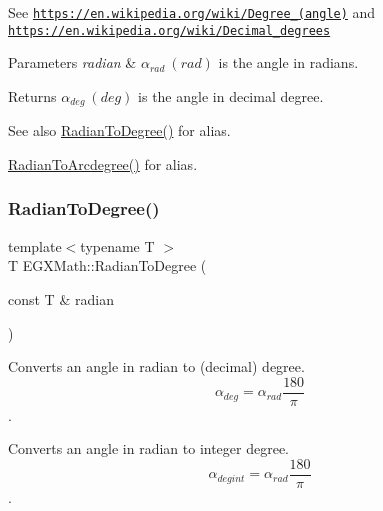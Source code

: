 See \href{https://en.wikipedia.org/wiki/Degree_(angle)}{\tt https\+://en.\+wikipedia.\+org/wiki/\+Degree\+\_\+(angle)} and \href{https://en.wikipedia.org/wiki/Decimal_degrees}{\tt https\+://en.\+wikipedia.\+org/wiki/\+Decimal\+\_\+degrees} 
\begin{DoxyParams}{Parameters}
{\em radian} & $\alpha_{rad}\ (rad)$ is the angle in radians. \\
\hline
\end{DoxyParams}
\begin{DoxyReturn}{Returns}
$\alpha_{deg}\ (deg)$ is the angle in decimal degree. 
\end{DoxyReturn}
\begin{DoxySeeAlso}{See also}
\mbox{\hyperlink{group___e_g_x_math-_angle_conversions-_radian_ga25bbce6cdc1c3621f2a158d320e3bc45}{Radian\+To\+Degree()}} for alias. 

\mbox{\hyperlink{group___e_g_x_math-_angle_conversions-_radian_ga3dfdc97357cc07f8379976bbc08f9852}{Radian\+To\+Arcdegree()}} for alias. 
\end{DoxySeeAlso}
\mbox{\label{group___e_g_x_math-_angle_conversions-_radian_ga25bbce6cdc1c3621f2a158d320e3bc45}} 
\subsubsection{\texorpdfstring{Radian\+To\+Degree()}{RadianToDegree()}}
{\footnotesize\ttfamily template$<$typename T $>$ \\
T E\+G\+X\+Math\+::\+Radian\+To\+Degree (\begin{DoxyParamCaption}\item[{const T \&}]{radian }\end{DoxyParamCaption})}



Converts an angle in radian to (decimal) degree. \[\alpha_{deg}=\alpha_{rad}\frac{180}{\pi}\]. 

Converts an angle in radian to integer degree. \[\alpha_{deg int}=\alpha_{rad}\frac{180}{\pi}\].

